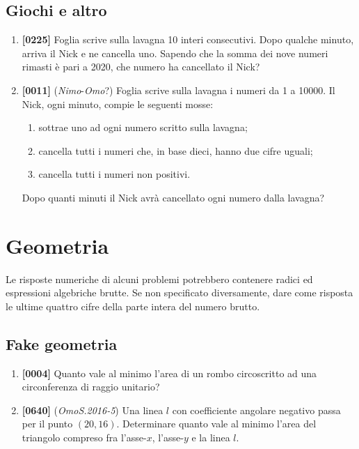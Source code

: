 \documentclass[10pt]{article}
\begin{document}
\subsection{Giochi e altro}
\begin{enumerate}
	\item \textbf{[0225]} Foglia scrive sulla lavagna 10 interi consecutivi. Dopo qualche minuto, arriva il Nick e ne cancella uno. Sapendo che la somma dei nove numeri rimasti è pari a 2020, che numero ha cancellato il Nick?

	\item \textbf{[0011]} (\textit{Nimo}-\textit{Omo}?) Foglia scrive sulla lavagna i numeri da 1 a 10000. Il Nick, ogni minuto, compie le seguenti mosse:
		\begin{enumerate}
			\item sottrae uno ad ogni numero scritto sulla lavagna;
			\item cancella tutti i numeri che, in base dieci, hanno due cifre uguali;
			\item cancella tutti i numeri non positivi.
		\end{enumerate}
		Dopo quanti minuti il Nick avrà cancellato ogni numero dalla lavagna?
\end{enumerate}


\newpage
\section{Geometria}

Le risposte numeriche di alcuni problemi potrebbero contenere radici ed espressioni algebriche brutte. Se non specificato diversamente, dare come risposta le ultime quattro cifre della parte intera del numero brutto.

\subsection{Fake geometria}
\begin{enumerate}
	\item \textbf{[0004]} Quanto vale al minimo l'area di un rombo circoscritto ad una circonferenza di raggio unitario?

	\item \textbf{[0640]} (\textit{OmoS.2016-5}) Una linea $l$ con coefficiente angolare negativo passa per il punto $(20,16)$. Determinare quanto vale al minimo l'area del triangolo compreso fra l'asse-$x$, l'asse-$y$ e la linea $l$.
\end{enumerate}
\end{document}
